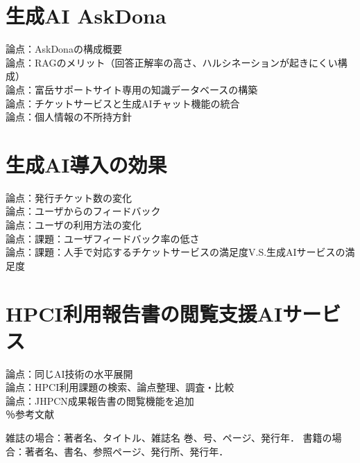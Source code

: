 \documentclass{jsaxiesproc}
\begin{document}
\section{生成AI AskDona}

論点：AskDonaの構成概要\\
論点：RAGのメリット（回答正解率の高さ、ハルシネーションが起きにくい構成）\\
論点：富岳サポートサイト専用の知識データベースの構築\\
論点：チケットサービスと生成AIチャット機能の統合\\
論点：個人情報の不所持方針\\


\section{生成AI導入の効果}

論点：発行チケット数の変化\\
論点：ユーザからのフィードバック\\
論点：ユーザの利用方法の変化\\
論点：課題：ユーザフィードバック率の低さ\\
論点：課題：人手で対応するチケットサービスの満足度V.S.生成AIサービスの満足度\\


\section{HPCI利用報告書の閲覧支援AIサービス}
論点：同じAI技術の水平展開\\
論点：HPCI利用課題の検索、論点整理、調査・比較\\
論点：JHPCN成果報告書の閲覧機能を追加\\


％参考文献
\begin{thebibliography}{99}
	 雑誌の場合：著者名、タイトル、雑誌名 巻、号、ページ、発行年．
	 書籍の場合：著者名、書名、参照ページ、発行所、発行年．
\end{thebibliography}
\end{document}

